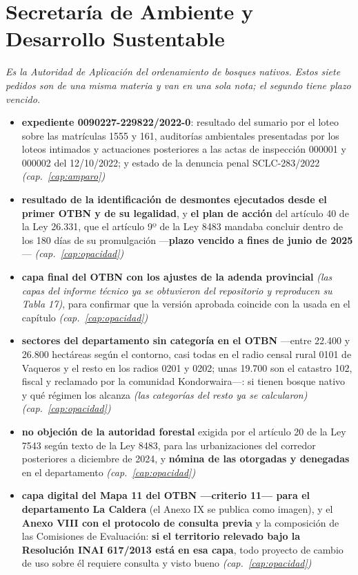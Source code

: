 \section{Secretaría de Ambiente y Desarrollo Sustentable}

{\small\itshape Es la Autoridad de Aplicación del ordenamiento de bosques nativos. Estos siete pedidos son de una misma materia y van en una sola nota; el segundo tiene plazo vencido.\par}

\begin{itemize}[leftmargin=*,itemsep=0.35em]
\item \textbf{expediente 0090227-229822/2022-0}: resultado del sumario por el loteo sobre las matrículas 1555 y 161, auditorías ambientales presentadas por los loteos intimados y actuaciones posteriores a las actas de inspección 000001 y 000002 del 12/10/2022; y estado de la denuncia penal SCLC-283/2022 \textit{(cap.\ \ref{cap:amparo})}
\item \textbf{resultado de la identificación de desmontes ejecutados desde el primer OTBN y de su legalidad}, y \textbf{el plan de acción} del artículo 40 de la Ley 26.331, que el artículo 9º de la Ley 8483 mandaba concluir dentro de los 180 días de su promulgación ---\textbf{plazo vencido a fines de junio de 2025}--- \textit{(cap.\ \ref{cap:opacidad})}
\item \textbf{capa final del OTBN con los ajustes de la adenda provincial} \textit{(las capas del informe técnico ya se obtuvieron del repositorio y reproducen su Tabla 17)}, para confirmar que la versión aprobada coincide con la usada en el capítulo \textit{(cap.\ \ref{cap:opacidad})}
\item \textbf{sectores del departamento sin categoría en el OTBN} ---entre 22.400 y 26.800 hectáreas según el contorno, casi todas en el radio censal rural 0101 de Vaqueros y el resto en los radios 0201 y 0202; unas 19.700 son el catastro 102, fiscal y reclamado por la comunidad Kondorwaira---: si tienen bosque nativo y qué régimen los alcanza \textit{(las categorías del resto ya se calcularon)} \textit{(cap.\ \ref{cap:opacidad})}
\item \textbf{no objeción de la autoridad forestal} exigida por el artículo 20 de la Ley 7543 según texto de la Ley 8483, para las urbanizaciones del corredor posteriores a diciembre de 2024, y \textbf{nómina de las otorgadas y denegadas} en el departamento \textit{(cap.\ \ref{cap:opacidad})}
\item \textbf{capa digital del Mapa 11 del OTBN ---criterio 11--- para el departamento La Caldera} (el Anexo IX se publica como imagen), y el \textbf{Anexo VIII con el protocolo de consulta previa} y la composición de las Comisiones de Evaluación: \textbf{si el territorio relevado bajo la Resolución INAI 617/2013 está en esa capa}, todo proyecto de cambio de uso sobre él requiere consulta y visto bueno \textit{(cap.\ \ref{cap:opacidad})}

\end{itemize}
